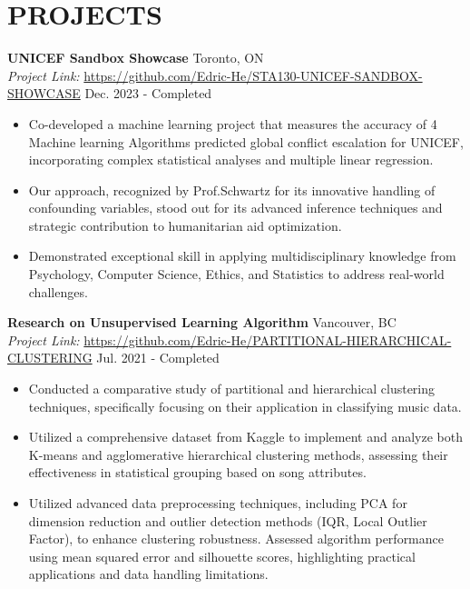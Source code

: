 \documentclass[a4paper,8pt]{extarticle}
\begin{document}
\section*{PROJECTS}
\noindent
\textbf{UNICEF Sandbox Showcase} \hfill Toronto, ON\\ %
\textit{Project Link:} \url{https://github.com/Edric-He/STA130-UNICEF-SANDBOX-SHOWCASE} \hfill Dec. 2023 - Completed %
\begin{itemize}
    \item Co-developed a machine learning project that measures the accuracy of 4 Machine learning Algorithms predicted global conflict escalation for UNICEF, incorporating complex statistical analyses and multiple linear regression.
    \item Our approach, recognized by Prof.Schwartz for its innovative handling of confounding variables, stood out for its advanced inference techniques and strategic contribution to humanitarian aid optimization.
    \item Demonstrated exceptional skill in applying multidisciplinary knowledge from Psychology, Computer Science, Ethics, and Statistics to address real-world challenges.
\end{itemize}
\noindent
\textbf{Research on Unsupervised Learning Algorithm} \hfill Vancouver, BC\\ %
\textit{Project Link:} \url{https://github.com/Edric-He/PARTITIONAL-HIERARCHICAL-CLUSTERING} \hfill Jul. 2021 - Completed %
\begin{itemize}
    \item Conducted a comparative study of partitional and hierarchical clustering techniques, specifically focusing on their application in classifying music data.
    \item Utilized a comprehensive dataset from Kaggle to implement and analyze both K-means and agglomerative hierarchical clustering methods, assessing their effectiveness in statistical grouping based on song attributes.
    \item Utilized advanced data preprocessing techniques, including PCA for dimension reduction and outlier detection methods (IQR, Local Outlier Factor), to enhance clustering robustness. Assessed algorithm performance using mean squared error and silhouette scores, highlighting practical applications and data handling limitations.
\end{itemize}
\end{document}
